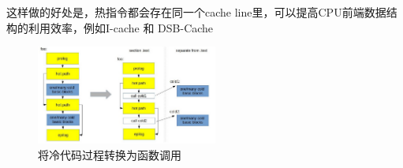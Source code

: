 这样做的好处是，热指令都会存在同一个cache line里，可以提高CPU前端数据结构的利用效率，例如I-cache 和 DSB-Cache

\begin{figure}[H]
    \centering
    \includegraphics[width=0.53\textwidth]{images/splitting.png}
    \caption{将冷代码过程转换为函数调用}
\end{figure}